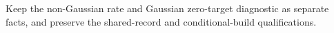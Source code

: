 Keep the non-Gaussian rate and Gaussian zero-target diagnostic as separate facts, and preserve the shared-record and conditional-build qualifications.